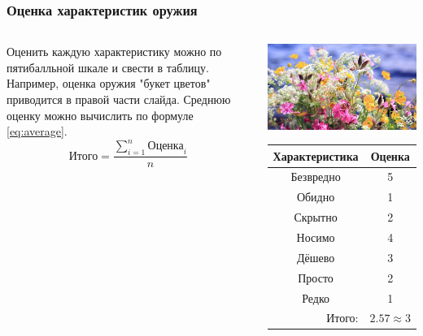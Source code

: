 \begin{frame}
    \frametitle{Оценка характеристик оружия}

    \begin{columns}
            Оценить каждую характеристику можно по пятибалльной шкале и свести в таблицу. Например, оценка оружия \alert{"букет цветов"} приводится в правой части слайда. Среднюю оценку можно вычислить по формуле \eqref{eq:average}. 
            \begin{equation}
                \label{eq:average}
                \text{Итого}=\frac{\displaystyle\sum_{i=1}^{n}\text{Оценка}_i}{n}
            \end{equation}
            
            
            \begin{center}
                \includegraphics[width=.4\textheight]{fig/flowers}
                
                \begin{tabular}{c|c}
                    \hline\hline
                    Характеристика              & Оценка\\ \hline\hline
                    Безвредно                   & 5 \\
                    Обидно                      & 1 \\
                    Скрытно                     & 2 \\
                    Носимо                      & 4 \\
                    Дёшево                      & 3 \\
                    Просто                      & 2 \\ 
                    Редко                       & 1 \\ \hline
                    \multicolumn{1}{r|}{Итого:} & $2.57\approx 3$ \\
                \end{tabular}
            \end{center}
    \end{columns}    
\end{frame}


